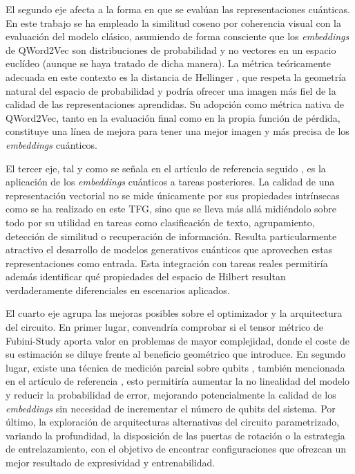 El segundo eje afecta a la forma en que se evalúan las representaciones cuánticas. En este trabajo se ha empleado la similitud coseno por coherencia visual con la evaluación del modelo clásico, asumiendo de forma consciente que los \textit{embeddings} de QWord2Vec son distribuciones de probabilidad y no vectores en un espacio euclídeo (aunque se haya tratado de dicha manera). La métrica teóricamente adecuada en este contexto es la distancia de Hellinger \cite{oecd_hellinger_distance}, que respeta la geometría natural del espacio de probabilidad y podría ofrecer una imagen más fiel de la calidad de las representaciones aprendidas. Su adopción como métrica nativa de QWord2Vec, tanto en la evaluación final como en la propia función de pérdida, constituye una línea de mejora para tener una mejor imagen y más precisa de los \textit{embeddings} cuánticos.

El tercer eje, tal y como se señala en el artículo de referencia seguido \cite{ohno_qword2vec_2025}, es la aplicación de los \textit{embeddings} cuánticos a tareas posteriores. La calidad de una representación vectorial no se mide únicamente por sus propiedades intrínsecas como se ha realizado en este TFG, sino que se lleva más allá midiéndolo sobre todo por su utilidad en tareas como clasificación de texto, agrupamiento, detección de similitud o recuperación de información. Resulta particularmente atractivo el desarrollo de modelos generativos cuánticos que aprovechen estas representaciones como entrada. Esta integración con tareas reales permitiría además identificar qué propiedades del espacio de Hilbert resultan verdaderamente diferenciales en escenarios aplicados.

El cuarto eje agrupa las mejoras posibles sobre el optimizador y la arquitectura del circuito. En primer lugar, convendría comprobar si el tensor métrico de Fubini-Study aporta valor en problemas de mayor complejidad, donde el coste de su estimación se diluye frente al beneficio geométrico que introduce. En segundo lugar, existe una técnica de medición parcial sobre qubits \cite{huang_power_2021}, también mencionada en el artículo de referencia \cite{ohno_qword2vec_2025}, esto permitiría aumentar la no linealidad del modelo y reducir la probabilidad de error, mejorando potencialmente la calidad de los \textit{embeddings} sin necesidad de incrementar el número de qubits del sistema. Por último, la exploración de arquitecturas alternativas del circuito parametrizado, variando la profundidad, la disposición de las puertas de rotación o la estrategia de entrelazamiento, con el objetivo de encontrar configuraciones que ofrezcan un mejor resultado de expresividad y entrenabilidad.


